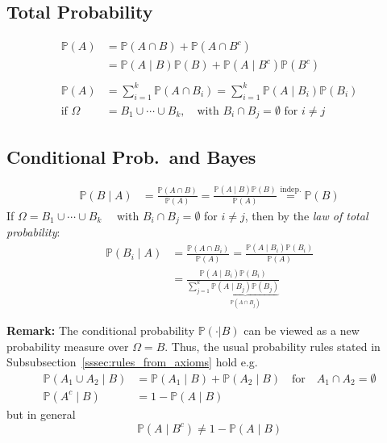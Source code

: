 \subsection{Total Probability}
\noindent\begin{align*}
    \mathbb{P}(A)     & =\mathbb{P}(A\cap B)+\mathbb{P}(A\cap B^c)                                           \\
                      & =\mathbb{P}(A\mid B)\mathbb{P}(B)+\mathbb{P}(A\mid B^c)\mathbb{P}(B^c)               \\\\
    \mathbb{P}(A)     & =\sum_{i=1}^k\mathbb{P}(A\cap B_i) =\sum_{i=1}^k\mathbb{P}(A\mid B_i)\mathbb{P}(B_i) \\
    \text{if } \Omega & =B_1\cup\cdots\cup B_k,\quad\text{with }B_i\cap B_j=\emptyset\text{ for }i\neq j
\end{align*}
\subsection{Conditional Prob.\ and Bayes}
\noindent\begin{align*}
    \mathbb{P}(B\mid A) & =\frac{\mathbb{P}(A\cap B)}{\mathbb{P}(A)}=\frac{\mathbb{P}(A\mid B)\mathbb{P}(B)}{\mathbb{P}(A)} \overset{\text{indep.}}{=} \mathbb{P}(B)
\end{align*}
If $\Omega=B_1\cup\cdots\cup B_k\quad$ with $B_i\cap B_j=\emptyset$ for $i\neq j$, then by the \textit{law of total probability}:
\noindent\begin{align*}
    \mathbb{P}(B_i\mid A) & =\frac{\mathbb{P}(A\cap B_i)}{\mathbb{P}(A)}=\frac{\mathbb{P}(A\mid B_i)\mathbb{P}(B_i)}{\mathbb{P}(A)}                              \\
                          & =\frac{\mathbb{P}(A\mid B_i)\mathbb{P}(B_i)}{\sum_{j=1}^k \underbrace{\mathbb{P}(A\mid B_j)\mathbb{P}(B_j)}_{\mathbb{P}(A\cap B_j)}}
\end{align*}

\textbf{Remark:} The conditional probability $\mathbb{P}(\cdot|B)$ can be viewed as a new probability measure over $\Omega=B$. Thus, the usual probability rules stated in Subsubsection\ \ref{sssec:rules_from_axioms} hold e.g.\:
\begin{align*}
    \mathbb{P}(A_1\cup A_2\mid B) & =\mathbb{P}(A_1\mid B)+\mathbb{P}(A_2\mid B)\quad\text{for}\quad A_1\cap A_2=\emptyset \\
    \mathbb{P}(A^c\mid B)         & =1-\mathbb{P}(A\mid B)
\end{align*}
but in general
\begin{equation*}
    \mathbb{P}(A\mid B^c)\neq1-\mathbb{P}(A\mid B)
\end{equation*}
